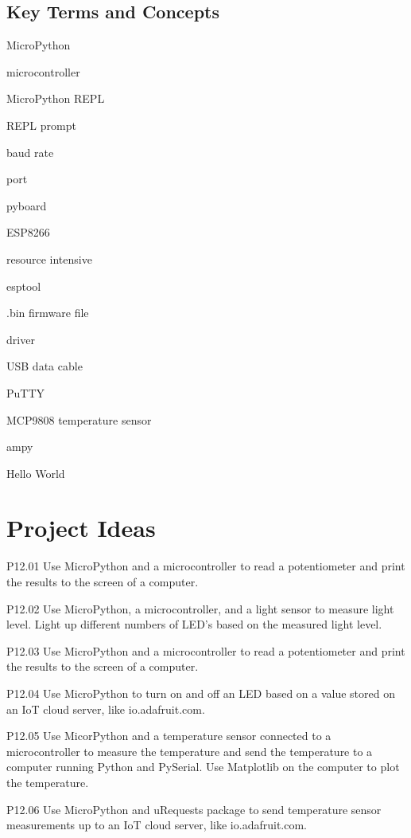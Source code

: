 \documentclass{book}
\newenvironment{problems}{}{}  %
\newenvironment{key_terms}{\begin{multicols}{3}}{\end{multicols}} %
\begin{document}
    
        \hypertarget{key-terms-and-concepts}{%
\subsection{Key Terms and Concepts}\label{key-terms-and-concepts}}
    




    
        \begin{key_terms}
        MicroPython

microcontroller

MicroPython REPL

REPL prompt

baud rate

port

pyboard

ESP8266

resource intensive

esptool

.bin firmware file

driver

USB data cable

PuTTY

MCP9808 temperature sensor

ampy

Hello World
        \end{key_terms}

    




    
        \hypertarget{project-ideas}{%
\section{Project Ideas}\label{project-ideas}}
    




    
        \begin{problems}
        P12.01 Use MicroPython and a microcontroller to read a potentiometer and
print the results to the screen of a computer.

P12.02 Use MicroPython, a microcontroller, and a light sensor to measure
light level. Light up different numbers of LED's based on the measured
light level.

P12.03 Use MicroPython and a microcontroller to read a potentiometer and
print the results to the screen of a computer.

P12.04 Use MicroPython to turn on and off an LED based on a value stored
on an IoT cloud server, like io.adafruit.com.

P12.05 Use MicorPython and a temperature sensor connected to a
microcontroller to measure the temperature and send the temperature to a
computer running Python and PySerial. Use Matplotlib on the computer to
plot the temperature.

P12.06 Use MicroPython and uRequests package to send temperature sensor
measurements up to an IoT cloud server, like io.adafruit.com.
        \end{problems}
\end{document}
